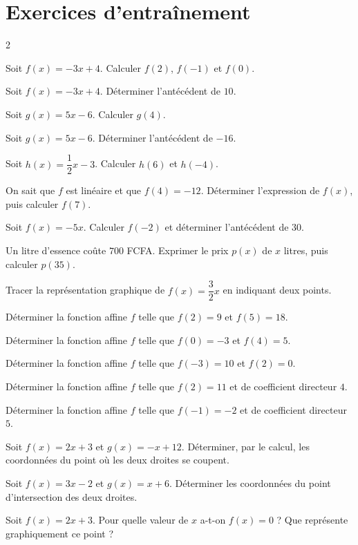 \section{Exercices d'entraînement}
\begin{multicols}{2}

\exo{} Soit $f(x)=-3x+4$. Calculer $f(2)$, $f(-1)$ et $f(0)$.

\exo{} Soit $f(x)=-3x+4$. Déterminer l'antécédent de $10$.

\exo{} Soit $g(x)=5x-6$. Calculer $g(4)$.

\exo{} Soit $g(x)=5x-6$. Déterminer l'antécédent de $-16$.

\exo{} Soit $h(x)=\dfrac12x-3$. Calculer $h(6)$ et $h(-4)$.

\exo{} On sait que $f$ est linéaire et que $f(4)=-12$. Déterminer l'expression de
$f(x)$, puis calculer $f(7)$.

\exo{} Soit $f(x)=-5x$. Calculer $f(-2)$ et déterminer l'antécédent de $30$.

\exo{} Un litre d'essence coûte $700$ FCFA. Exprimer le prix $p(x)$ de $x$ litres,
puis calculer $p(35)$.

\exo{} Tracer la représentation graphique de $f(x)=\dfrac32x$ en indiquant deux
points.

\exo{} Déterminer la fonction affine $f$ telle que $f(2)=9$ et $f(5)=18$.

\exo{} Déterminer la fonction affine $f$ telle que $f(0)=-3$ et $f(4)=5$.

\exo{} Déterminer la fonction affine $f$ telle que $f(-3)=10$ et $f(2)=0$.

\exo{} Déterminer la fonction affine $f$ telle que $f(2)=11$ et de coefficient
directeur $4$.

\exo{} Déterminer la fonction affine $f$ telle que $f(-1)=-2$ et de coefficient
directeur $5$.

\exo{} Soit $f(x)=2x+3$ et $g(x)=-x+12$. Déterminer, par le calcul, les
coordonnées du point où les deux droites se coupent.

\exo{} Soit $f(x)=3x-2$ et $g(x)=x+6$. Déterminer les coordonnées du point
d'intersection des deux droites.

\exo{} Soit $f(x)=2x+3$. Pour quelle valeur de $x$ a-t-on $f(x)=0$ ? Que représente
graphiquement ce point ?


\end{multicols}
